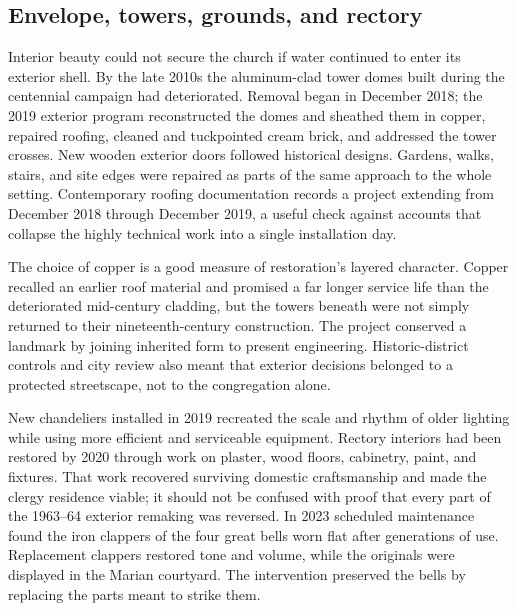\subsection{Envelope, towers, grounds, and rectory}

Interior beauty could not secure the church if water continued to enter its exterior shell. By the late 2010s the aluminum-clad tower domes built during the centennial campaign had deteriorated. Removal began in December 2018; the 2019 exterior program reconstructed the domes and sheathed them in copper, repaired roofing, cleaned and tuckpointed cream brick, and addressed the tower crosses. New wooden exterior doors followed historical designs. Gardens, walks, stairs, and site edges were repaired as parts of the same approach to the whole setting. Contemporary roofing documentation records a project extending from December 2018 through December 2019, a useful check against accounts that collapse the highly technical work into a single installation day.

The choice of copper is a good measure of restoration's layered character. Copper recalled an earlier roof material and promised a far longer service life than the deteriorated mid-century cladding, but the towers beneath were not simply returned to their nineteenth-century construction. The project conserved a landmark by joining inherited form to present engineering. Historic-district controls and city review also meant that exterior decisions belonged to a protected streetscape, not to the congregation alone.

New chandeliers installed in 2019 recreated the scale and rhythm of older lighting while using more efficient and serviceable equipment. Rectory interiors had been restored by 2020 through work on plaster, wood floors, cabinetry, paint, and fixtures. That work recovered surviving domestic craftsmanship and made the clergy residence viable; it should not be confused with proof that every part of the 1963--64 exterior remaking was reversed. In 2023 scheduled maintenance found the iron clappers of the four great bells worn flat after generations of use. Replacement clappers restored tone and volume, while the originals were displayed in the Marian courtyard. The intervention preserved the bells by replacing the parts meant to strike them.


